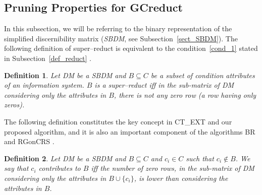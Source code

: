 \documentclass[authoryear,preprint,review,12pt]{elsarticle}
\newtheorem{definition}{Definition}
\begin{document}

  
\subsection{Pruning Properties for GCreduct}\label{properties}
	In this subsection, we will be referring to the binary representation of the simplified discernibility matrix
	(\textit{SBDM}, see Subsection~\ref{sect_SBDM}). The following definition of super--reduct is equivalent to the condition~\ref{cond_1} stated in 
	Subsection~\ref{def_reduct} \citep{Lazo15}.
	
	\begin{definition}\label{def:testor}
		Let DM be a SBDM and $B \subseteq C$ be a subset of condition attributes of an information system. $B$ is a super--reduct iff in the sub-matrix of DM considering only the attributes in $B$, there is not any zero row (a row having only zeros).
	\end{definition}
	
	The following definition constitutes the key concept in CT\_EXT \citep{Sanchez07} and our proposed algorithm, and it is also an important component of the algorithms BR \citep{Lias09} and RGonCRS
	\citep{WangP07}.
		
	\begin{definition}\label{def:contrib}
		Let DM be a SBDM and $B \subseteq C$ and  $c_i \in C$ such that $c_i \notin B$. We say that $c_i$ contributes to $B$ iff the	number of zero rows, in the sub-matrix of DM considering only the attributes in $B\cup\{c_i\}$, is lower than considering the attributes in $B$.
	\end{definition}
	
\end{document}
